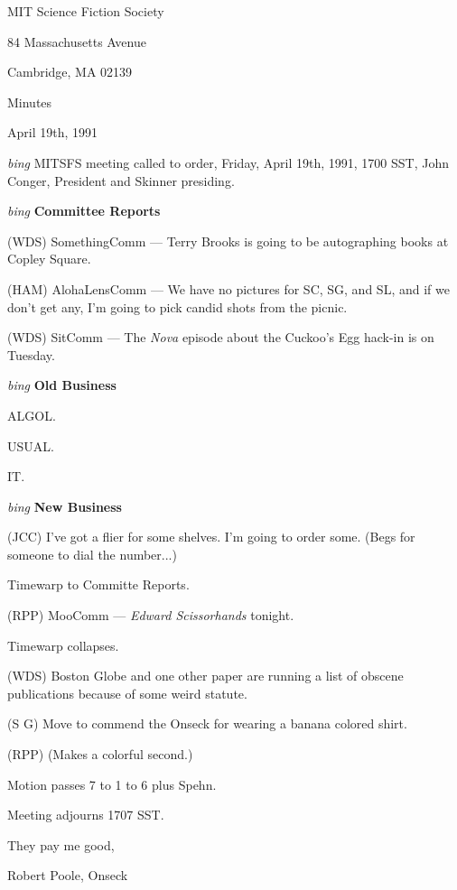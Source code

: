 \setlength{\topmargin}{-0.5in}
\setlength{\oddsidemargin}{0.0in}
\setlength{\evensidemargin}{0.0in}
\setlength{\textheight}{9in}
\setlength{\textwidth}{6.5in}



\begin{center}
MIT Science Fiction Society

84 Massachusetts Avenue

Cambridge, MA 02139

\vspace{0.2in}
Minutes

April 19th, 1991

\end{center}

\vspace{0.15in}
{\em bing\/}  MITSFS meeting called to order, Friday, April 19th, 1991,
1700 SST, John Conger, President and Skinner presiding.

\vspace{0.15in}
{\em bing\/} {\bf Committee Reports\/}

(WDS) SomethingComm --- Terry Brooks is going to be autographing books at
Copley Square.

(HAM) AlohaLensComm --- We have no pictures for SC, SG, and SL, and if we
don't get any, I'm going to pick candid shots from the picnic.

(WDS) SitComm --- The {\em Nova\/} episode about the Cuckoo's Egg hack-in
is on Tuesday.

\vspace{.15in}
{\em bing\/} {\bf Old Business\/}

ALGOL.

USUAL.

IT.

\vspace{0.15in}
{\em bing\/} {\bf New Business\/}

(JCC) I've got a flier for some shelves.  I'm going to order some.  (Begs for
someone to dial the number...)

Timewarp to Committe Reports.

(RPP) MooComm --- {\em Edward Scissorhands\/} tonight.

Timewarp collapses.

(WDS) Boston Globe and one other paper are running a list of obscene
publications because of some weird statute.

(S G) Move to commend the Onseck for wearing a banana colored shirt.

(RPP) (Makes a colorful second.)

Motion passes 7 to 1 to 6 plus Spehn.

Meeting adjourns 1707 SST.

\vspace{0.15in}
\begin{center}
They pay me good,

Robert Poole, Onseck
\end{center}

